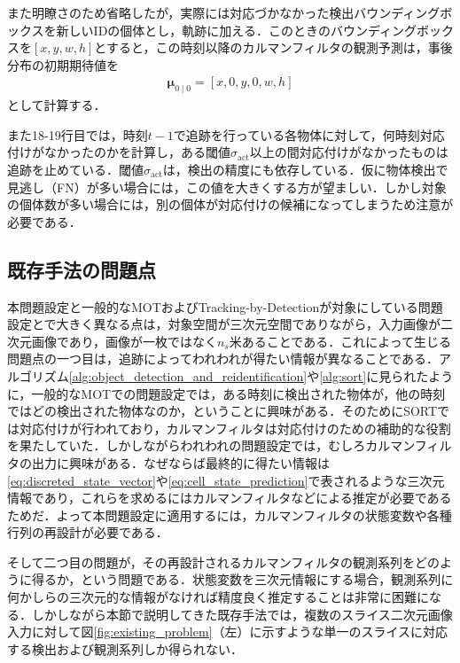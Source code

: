     また明瞭さのため省略したが，実際には対応づかなかった検出バウンディングボックスを新しいIDの個体とし，軌跡に加える．このときのバウンディングボックスを$[x,y,w,h]$とすると，この時刻以降のカルマンフィルタの観測予測は，事後分布の初期期待値を
    \begin{equation}
        \label{eq:SORT_kalman_initialize}
        \begin{aligned}
            \bm{\mu}_{0 \mid 0} = \left[x, 0, y, 0, w, h\right]
        \end{aligned}
    \end{equation}
    として計算する．

    また18-19行目では，時刻$t-1$で追跡を行っている各物体に対して，何時刻対応付けがなかったのかを計算し，ある閾値$\sigma_{\text{act}}$以上の間対応付けがなかったものは追跡を止めている．閾値$\sigma_{\text{act}}$は，検出の精度にも依存している．仮に物体検出で見逃し（FN）が多い場合には，この値を大きくする方が望ましい．しかし対象の個体数が多い場合には，別の個体が対応付けの候補になってしまうため注意が必要である．

    \subsection{既存手法の問題点}
    \label{subsec:existing_problem}

    本問題設定と一般的なMOTおよびTracking-by-Detectionが対象にしている問題設定とで大きく異なる点は，対象空間が三次元空間でありながら，入力画像が二次元画像であり，画像が一枚ではなく$n_s$米あることである．これによって生じる問題点の一つ目は，追跡によってわれわれが得たい情報が異なることである．アルゴリズム\ref{alg:object_detection_and_reidentification}や\ref{alg:sort}に見られたように，一般的なMOTでの問題設定では，ある時刻に検出された物体が，他の時刻ではどの検出された物体なのか，ということに興味がある．そのためにSORTでは対応付けが行われており，カルマンフィルタは対応付けのための補助的な役割を果たしていた．しかしながらわれわれの問題設定では，むしろカルマンフィルタの出力に興味がある．なぜならば最終的に得たい情報は\ref{eq:discreted_state_vector}や\ref{eq:cell_state_prediction}で表されるような三次元情報であり，これらを求めるにはカルマンフィルタなどによる推定が必要であるためだ．よって本問題設定に適用するには，カルマンフィルタの状態変数や各種行列の再設計が必要である．

    そして二つ目の問題が，その再設計されるカルマンフィルタの観測系列をどのように得るか，という問題である．状態変数を三次元情報にする場合，観測系列に何かしらの三次元的な情報がなければ精度良く推定することは非常に困難になる．しかしながら本節で説明してきた既存手法では，複数のスライス二次元画像入力に対して図\ref{fig:existing_problem}（左）に示すような単一のスライスに対応する検出および観測系列しか得られない．

